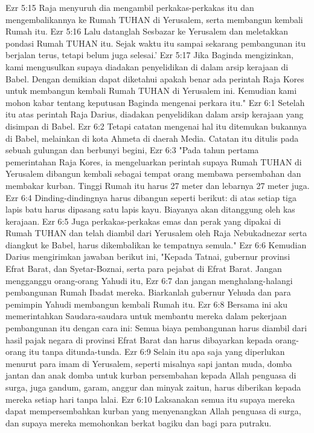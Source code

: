Ezr 5:15  Raja menyuruh dia mengambil perkakas-perkakas itu dan mengembalikannya ke Rumah TUHAN di Yerusalem, serta membangun kembali Rumah itu.
Ezr 5:16  Lalu datanglah Sesbazar ke Yerusalem dan meletakkan pondasi Rumah TUHAN itu. Sejak waktu itu sampai sekarang pembangunan itu berjalan terus, tetapi belum juga selesai.'
Ezr 5:17  Jika Baginda mengizinkan, kami mengusulkan supaya diadakan penyelidikan di dalam arsip kerajaan di Babel. Dengan demikian dapat diketahui apakah benar ada perintah Raja Kores untuk membangun kembali Rumah TUHAN di Yerusalem ini. Kemudian kami mohon kabar tentang keputusan Baginda mengenai perkara itu."
Ezr 6:1  Setelah itu atas perintah Raja Darius, diadakan penyelidikan dalam arsip kerajaan yang disimpan di Babel.
Ezr 6:2  Tetapi catatan mengenai hal itu ditemukan bukannya di Babel, melainkan di kota Ahmeta di daerah Media. Catatan itu ditulis pada sebuah gulungan dan berbunyi begini,
Ezr 6:3  "Pada tahun pertama pemerintahan Raja Kores, ia mengeluarkan perintah supaya Rumah TUHAN di Yerusalem dibangun kembali sebagai tempat orang membawa persembahan dan membakar kurban. Tinggi Rumah itu harus 27 meter dan lebarnya 27 meter juga.
Ezr 6:4  Dinding-dindingnya harus dibangun seperti berikut: di atas setiap tiga lapis batu harus dipasang satu lapis kayu. Biayanya akan ditanggung oleh kas kerajaan.
Ezr 6:5  Juga perkakas-perkakas emas dan perak yang dipakai di Rumah TUHAN dan telah diambil dari Yerusalem oleh Raja Nebukadnezar serta diangkut ke Babel, harus dikembalikan ke tempatnya semula."
Ezr 6:6  Kemudian Darius mengirimkan jawaban berikut ini, "Kepada Tatnai, gubernur provinsi Efrat Barat, dan Syetar-Boznai, serta para pejabat di Efrat Barat. Jangan mengganggu orang-orang Yahudi itu,
Ezr 6:7  dan jangan menghalang-halangi pembangunan Rumah Ibadat mereka. Biarkanlah gubernur Yehuda dan para pemimpin Yahudi membangun kembali Rumah itu.
Ezr 6:8  Bersama ini aku memerintahkan Saudara-saudara untuk membantu mereka dalam pekerjaan pembangunan itu dengan cara ini: Semua biaya pembangunan harus diambil dari hasil pajak negara di provinsi Efrat Barat dan harus dibayarkan kepada orang-orang itu tanpa ditunda-tunda.
Ezr 6:9  Selain itu apa saja yang diperlukan menurut para imam di Yerusalem, seperti misalnya sapi jantan muda, domba jantan dan anak domba untuk kurban persembahan kepada Allah penguasa di surga, juga gandum, garam, anggur dan minyak zaitun, harus diberikan kepada mereka setiap hari tanpa lalai.
Ezr 6:10  Laksanakan semua itu supaya mereka dapat mempersembahkan kurban yang menyenangkan Allah penguasa di surga, dan supaya mereka memohonkan berkat bagiku dan bagi para putraku.
